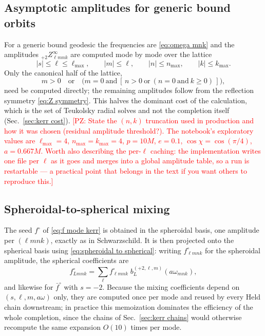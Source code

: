 \documentclass[preprint,aps,nofootinbib,a4paper,superscriptaddress,longbibliography,amsfonts, amssymb,amsmath,titlepage]{revtex4-1}
\numberwithin{equation}{section} %
\newcommand{\PZ}[1]{\textcolor{red}{\textsf{[PZ: #1]}}}
\newcommand{\emm}{m}
\def\l{\ensuremath{\ell}}
\def\fHo{f^{\circ}}
\def\fbHo{\bar f^{\circ}}
\newcommand{\Zinf}[2]{{}_{#1}Z^{\infty}_{#2}}
\def\lmnk{\l \emm n k}
\def\wmnk{\omega_{\emm n k}}
\begin{document}
\subsection{Asymptotic amplitudes for generic bound orbits}
\label{sec:generic orbits}
For a generic bound geodesic the frequencies are \eqref{eq:omega mnk} and the
amplitudes $\Zinf{+2}{\lmnk}$ are computed mode by mode over the lattice
\begin{equation}\label{eq:mode lattice}
|s|\le\l\le\l_{\max},
\qquad
|\emm|\le\l,
\qquad
|n|\le n_{\max},
\qquad
|k|\le k_{\max}.
\end{equation}
Only the canonical half of the lattice,
\begin{equation}\label{eq:canonical half}
\emm>0
\quad\text{or}\quad
\big(\emm=0 \ \text{and}\ [\,n>0 \ \text{or}\ (n=0\ \text{and}\ k\ge0)\,]\big),
\end{equation}
need be computed directly; the remaining amplitudes follow from the
reflection symmetry \eqref{eq:Z symmetry}.  This halves the dominant cost of
the calculation, which is the set of Teukolsky radial solves and not the
completion itself (Sec.~\ref{sec:kerr cost}).
\PZ{State the $(n,k)$ truncation used in production and how it was chosen
(residual amplitude threshold?).  The notebook's exploratory values are
$\l_{\max}=4$, $n_{\max}=k_{\max}=4$, $p=10M$, $e=0.1$,
$\cos\chi=\cos(\pi/4)$, $a=0.667M$.  Worth also describing the per-$\l$
caching: the implementation writes one file per $\l$ as it goes and merges
into a global amplitude table, so a run is restartable --- a practical point
that belongs in the text if you want others to reproduce this.}

\subsection{Spheroidal-to-spherical mixing}
\label{sec:kerr mixing}
The seed $\fHo$ of \eqref{eq:f mode kerr} is obtained in the spheroidal
basis, one amplitude per $(\lmnk)$, exactly as in Schwarzschild.  It is then
projected onto the spherical basis using \eqref{eq:spheroidal to spherical}:
writing $\fHo_{\lmnk}$ for the spheroidal amplitude, the spherical
coefficients are
\begin{equation}\label{eq:f Y basis}
\fHo_{L\emm nk}
=
\sum_{\l}\fHo_{\lmnk}\;b^{(+2,\l,\emm)}_{L}(a\wmnk),
\end{equation}
and likewise for $\fbHo$ with $s=-2$.  Because the mixing coefficients depend
on $(s,\l,\emm,a\omega)$ only, they are computed once per mode and reused by
every Held chain downstream; in practice this memoization dominates the
efficiency of the whole completion, since the chains of
Sec.~\ref{sec:kerr chains} would otherwise recompute the same expansion
$O(10)$ times per mode.
\end{document}
